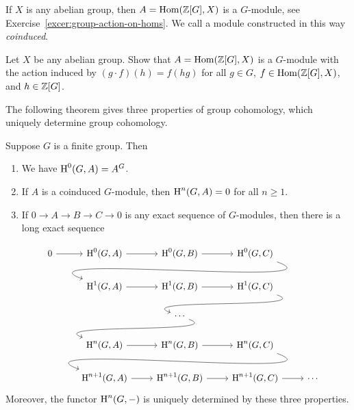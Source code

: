 \begin{definition}
	If $X$ is any abelian group, then $A = \operatorname{Hom}(\mathbb{Z}[G], X)$
	is a $G$-module, see Exercise~\ref{excer:group-action-on-homs}.
	We call a module constructed in this way \emph{coinduced}.
\end{definition}

\begin{exercise}\label{excer:group-action-on-homs}
	Let $X$ be any abelian group. Show that $A = \operatorname{Hom}(\mathbb{Z}[G],X)$
	is a $G$-module with the action induced by $(g\cdot f)(h) = f(hg)$
	for all $g\in G$, $f\in \operatorname{Hom}(\mathbb{Z}[G],X)$, and $h\in \mathbb{Z}[G]$.
\end{exercise}


The following theorem gives three properties of group cohomology,
which uniquely determine group cohomology.
\begin{theorem}\label{thm:cohomology}
	Suppose $G$ is a finite group.  Then
	\begin{enumerate}
		\item
			We have $\operatorname{H}^0(G,A) = A^G$.
		\item
			If $A$ is a coinduced $G$-module,
			then $\operatorname{H}^n(G,A) = 0$ for all $n\geq 1$.
		\item
			If $0\to A \to B \to C \to 0$ is any exact sequence of
			$G$-modules, then there is a long exact sequence
	\end{enumerate}
	$$
	\begin{tikzcd}
0 \rar & \H^0(G,A) \rar & \H^0(G,B) \rar & \H^0(G,C) \ar[out=-20, in=160]{dll}
\\
& \H^1(G,A) \rar & \H^1(G,B) \rar & \H^1(G,C) \ar[out=-20, in=160]{dl}
\\
& & \cdots \ar[out=-20, in=160]{dl}
\\
& \H^n(G,A) \rar & \H^n(G,B) \rar & \H^n(G,C) \ar[out=-20, in=160]{dll}
\\
& \H^{n+1}(G,A) \rar & \H^{n+1}(G,B) \rar & \H^{n+1}(G,C) \rar & \cdots
	\end{tikzcd}
	$$
	Moreover, the functor $\operatorname{H}^n(G,-)$ is uniquely determined by
	these three properties.
\end{theorem}

